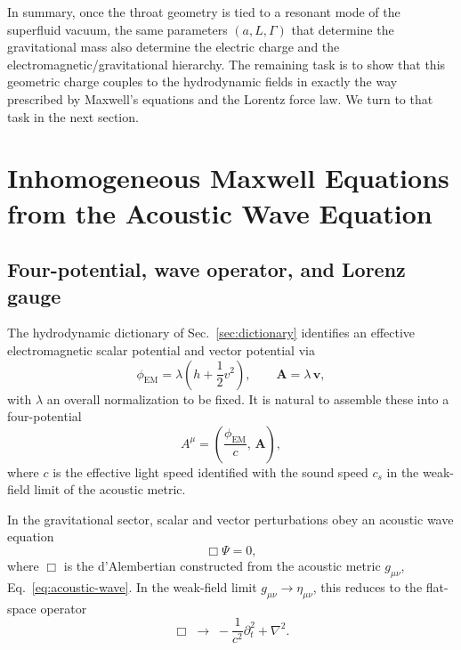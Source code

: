 \documentclass[11pt]{article}
\begin{document}
In summary, once the throat geometry is tied to a resonant mode of the superfluid vacuum, the same parameters $(a,L,\Gamma)$ that determine the gravitational mass also determine the electric charge and the electromagnetic/gravitational hierarchy.  The remaining task is to show that this geometric charge couples to the hydrodynamic fields in exactly the way prescribed by Maxwell's equations and the Lorentz force law.  We turn to that task in the next section.

\section{Inhomogeneous Maxwell Equations from the Acoustic Wave Equation}
\label{sec:inhomogeneous-maxwell}

\subsection{Four-potential, wave operator, and Lorenz gauge}

The hydrodynamic dictionary of Sec.~\ref{sec:dictionary} identifies an effective electromagnetic scalar potential and vector potential via
\begin{equation}
\phi_{\mathrm{EM}} = \lambda \left(h + \frac{1}{2} v^2\right),
\qquad
\mathbf{A} = \lambda\,\mathbf{v},
\end{equation}
with $\lambda$ an overall normalization to be fixed.  It is natural to assemble these into a four-potential
\begin{equation}
A^\mu = \left(\frac{\phi_{\mathrm{EM}}}{c},\,\mathbf{A}\right),
\end{equation}
where $c$ is the effective light speed identified with the sound speed $c_s$ in the weak-field limit of the acoustic metric.

In the gravitational sector, scalar and vector perturbations obey an acoustic wave equation
\begin{equation}
\Box \Psi = 0,
\end{equation}
where $\Box$ is the d'Alembertian constructed from the acoustic metric $g_{\mu\nu}$, Eq.~\eqref{eq:acoustic-wave}.  In the weak-field limit $g_{\mu\nu} \rightarrow \eta_{\mu\nu}$, this reduces to the flat-space operator
\begin{equation}
\Box \;\rightarrow\; -\frac{1}{c^2}\partial_t^2 + \nabla^2.
\label{eq:flat-box}
\end{equation}
\end{document}
